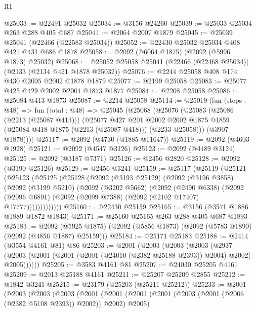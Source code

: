 \begin{lexlean}{R1}
\begin{coremodule}
@25033 := @22491 @25032
@25034 := @3156 @24260
@25039 := @25033 @25034 @263 @288 @405 @687
@25041 := @2064 @2007 @1879
@25045 := @25039 @25041 (@22466 (@22583 @25034))
@25052 := @22430 @25032 @25034 @408 @421 @431 @686 @1878
@25058 := @2092 (@6064 @1875) (@2092 (@5996 @1873) @25032)
@25068 := @25052 @25058 @25041 (@22466 (@22468 @25034)) (@2133 (@2134 @421 @1878 @25032))
@25076 := @2244 @25058 @408 @174 @430 @2005 @2002 @1878 @1879
@25077 := @2199 @25058
@25083 := @25077 @425 @429 @2002 @2004 @1873 @1877
@25084 := @2208 @25058
@25086 := @25084 @413 @1873
@25087 := @2214 @25058
@25114 := @25019
    (fun (steps : @48) =>
    fun (total : @48) =>
    @25045
      (@25068
        (@25076
          (@25083
            (@25086 (@2213 (@25087 @413)))
            (@25077
              @427
              @201
              @2002
              @2002
              @1875
              @1859
              (@25084 @418 @1875 (@2213 (@25087 @418)))
              (@2233 @25058)))
          (@3907 @1878))))
@25117 := @2092 (@4730 (@1885 @11647))
@25119 := @2092 (@4603 @1928)
@25121 := @2092 (@4547 @3126)
@25123 := @2092 (@4489 @3124)
@25125 := @2092 (@3187 @7371)
@25126 := @2456 @2820
@25128 := @2092 (@3190 @25126)
@25129 := @2456 @3241
@25159 := @25117
    (@25119
      (@25121
        (@25123
          (@25125
            (@25128
              (@2092
                (@3193 @25129)
                (@2092
                  (@3196 @3858)
                  (@2092
                    (@3199 @5210)
                    (@2092
                      (@3202 @5662)
                      (@2092
                        (@2490 @6338)
                        (@2092
                          (@2096 @6891)
                          (@2092 (@2099 @7388) (@2092 (@2102 @17407) @17777)))))))))))))
@25160 := @22430 @25159
@25165 := @3156 (@3571 @1886 @1889 @1872 @1843)
@25171 := @25160 @25165 @263 @288 @405 @687 @1893
@25183 := @2092
    (@5925 @1875)
    (@2092 (@5856 @1873) (@2092 (@5783 @1890) (@2092 (@4856 @1887) @25159)))
@25184 := @25171 @25183
@25188 := @2414 (@3554 @4161 @81) @86
@25203 := @2001
    (@2003
      (@2003
        (@2003
          (@2937 (@2003 (@2001 (@2001 (@2001 (@24010 (@2382 @25188 @2393)) @2004) @2002) @2005))))))
@25205 := @3583 @4161 @81
@25207 := @24030 @25205 @4161
@25209 := @2013 @25188 @4161
@25211 := @25207 @25209 @2855
@25212 := @1842 @3241
@25215 := @23179 (@25203 (@25211 @25212))
@25233 := @2001
    (@2003
      (@2003
        (@2003
          (@2001
            (@2001
              (@2001 (@2001 (@2003 (@2001 (@2006 (@2382 @5108 @2393)) @2002)) @2002) @2005)

\end{coremodule}
\end{lexlean}
